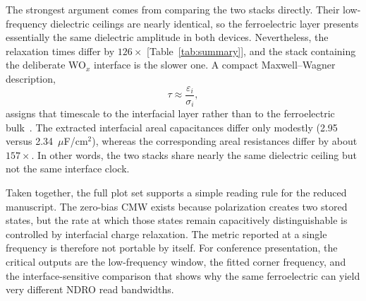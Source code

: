 The strongest argument comes from comparing the two stacks directly. Their low-frequency dielectric ceilings are nearly identical, so the ferroelectric layer presents essentially the same dielectric amplitude in both devices. Nevertheless, the relaxation times differ by $126\times$ [Table~\ref{tab:summary}], and the stack containing the deliberate WO$_x$ interface is the slower one. A compact Maxwell--Wagner description,
\begin{equation}
\tau \approx \frac{\varepsilon_i}{\sigma_i},
\label{eq:mw_short}
\end{equation}
assigns that timescale to the interfacial layer rather than to the ferroelectric bulk~\cite{alcala2023,kremer2003}. The extracted interfacial areal capacitances differ only modestly (2.95 versus 2.34~$\mu$F/cm$^2$), whereas the corresponding areal resistances differ by about $157\times$. In other words, the two stacks share nearly the same dielectric ceiling but not the same interface clock.

Taken together, the full plot set supports a simple reading rule for the reduced manuscript. The zero-bias CMW exists because polarization creates two stored states, but the rate at which those states remain capacitively distinguishable is controlled by interfacial charge relaxation. The metric reported at a single frequency is therefore not portable by itself. For conference presentation, the critical outputs are the low-frequency window, the fitted corner frequency, and the interface-sensitive comparison that shows why the same ferroelectric can yield very different NDRO read bandwidths.
